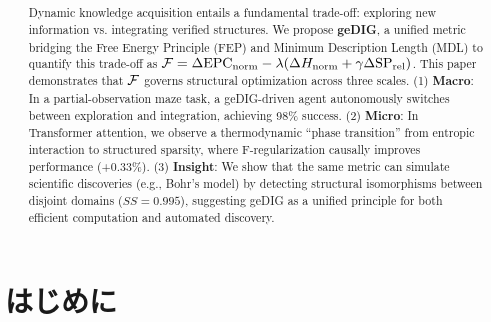 
\title{
}


\author{%
}


\begin{abstract}
Dynamic knowledge acquisition entails a fundamental trade-off: exploring new information vs. integrating verified structures. We propose \textbf{geDIG}, a unified metric bridging the Free Energy Principle (FEP) and Minimum Description Length (MDL) to quantify this trade-off as $\mathcal{F} = \Delta\mathrm{EPC}_{\mathrm{norm}} - \lambda(\Delta H_{\mathrm{norm}} + \gamma \Delta \mathrm{SP}_{\mathrm{rel}})$. This paper demonstrates that $\mathcal{F}$ governs structural optimization across three scales. (1) \textbf{Macro}: In a partial-observation maze task, a geDIG-driven agent autonomously switches between exploration and integration, achieving 98\% success. (2) \textbf{Micro}: In Transformer attention, we observe a thermodynamic ``phase transition'' from entropic interaction to structured sparsity, where F-regularization causally improves performance (+0.33\%). (3) \textbf{Insight}: We show that the same metric can simulate scientific discoveries (e.g., Bohr's model) by detecting structural isomorphisms between disjoint domains ($SS=0.995$), suggesting geDIG as a unified principle for both efficient computation and automated discovery.
\end{abstract}


\maketitle

\section{はじめに}

